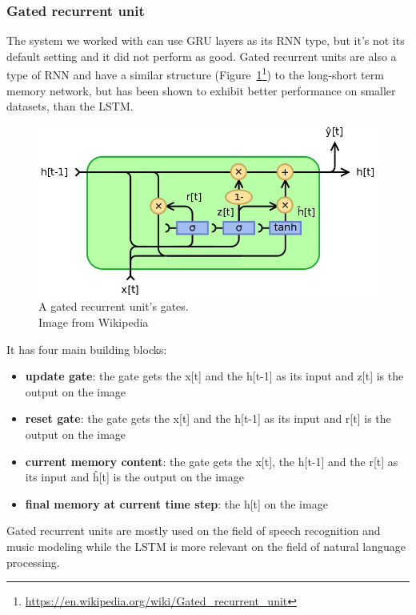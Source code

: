 \subsubsection{Gated recurrent unit}
The system we worked with can use GRU layers as its RNN type, but it's not its default setting and it did not perform as good.
Gated recurrent units are also a type of RNN and have a similar structure (Figure~\ref{fig:gru}\footnote{\url{https://en.wikipedia.org/wiki/Gated_recurrent_unit}}) to the long-short term memory network, but has been shown to exhibit better performance on smaller datasets, than the LSTM.
\begin{figure}[!htb]
	\centering
	\includegraphics[scale=0.5]{gru.jpg}
	\caption{A gated recurrent unit's gates.\\Image from Wikipedia}
	\label{fig:gru}
\end{figure}

\begin{minipage}{\textwidth}
It has four main building blocks:
\begin{itemize}
	\item \textbf{update gate}: the gate gets the x[t] and the h[t-1] as its input and z[t] is the output on the image
	\item \textbf{reset gate}: the gate gets the x[t] and the h[t-1] as its input and r[t] is the output on the image
	\item \textbf{current memory content}: the gate gets the x[t], the h[t-1] and the r[t] as its input and \^{h}[t] is the output on the image
	\item \textbf{final memory at current time step}: the h[t] on the image
\end{itemize}
\end{minipage}

Gated recurrent units are mostly used on the field of speech recognition and music modeling while the LSTM is more relevant on the field of natural language processing.


